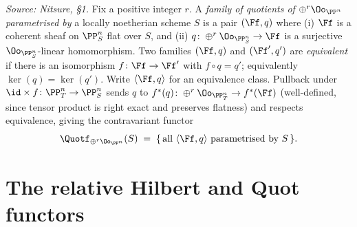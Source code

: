 \begin{definition}
  \label{def:quot-functor-pn}
  \textit{Source: Nitsure, §1.}
  Fix a positive integer $r$. A \emph{family of quotients of $\oplus^r\Oo_{\PP^n}$
  parametrised by} a locally noetherian scheme $S$ is a pair $(\Ff,q)$ where
  (i) $\Ff$ is a coherent sheaf on $\PP^n_S$ flat over $S$, and
  (ii) $q\colon\oplus^r\Oo_{\PP^n_S}\to\Ff$ is a surjective
  $\Oo_{\PP^n_S}$-linear homomorphism. Two families $(\Ff,q)$ and $(\Ff',q')$ are
  \emph{equivalent} if there is an isomorphism $f\colon\Ff\to\Ff'$ with
  $f\circ q = q'$; equivalently $\ker(q) = \ker(q')$. Write $\langle\Ff,q\rangle$
  for an equivalence class. Pullback under $\id\times f\colon\PP^n_T\to\PP^n_S$
  sends $q$ to $f^*(q)\colon\oplus^r\Oo_{\PP^n_T}\to f^*(\Ff)$ (well-defined,
  since tensor product is right exact and preserves flatness) and respects
  equivalence, giving the contravariant functor
  \[
    \Quotf_{\oplus^r\Oo_{\PP^n}}(S) \;=\;
    \{\,\text{all }\langle\Ff,q\rangle \text{ parametrised by } S\,\}.
  \]
\end{definition}

\section{The relative Hilbert and Quot functors}

